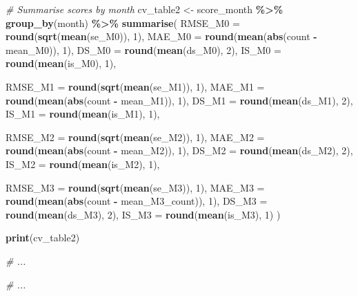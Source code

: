 \documentclass[
]{article}
\newenvironment{Shaded}{\begin{snugshade}}{\end{snugshade}}
\newcommand{\AttributeTok}[1]{\textcolor[rgb]{0.13,0.29,0.53}{#1}}
\newcommand{\CommentTok}[1]{\textcolor[rgb]{0.56,0.35,0.01}{\textit{#1}}}
\newcommand{\DecValTok}[1]{\textcolor[rgb]{0.00,0.00,0.81}{#1}}
\newcommand{\FunctionTok}[1]{\textcolor[rgb]{0.13,0.29,0.53}{\textbf{#1}}}
\newcommand{\NormalTok}[1]{#1}
\newcommand{\OtherTok}[1]{\textcolor[rgb]{0.56,0.35,0.01}{#1}}
\newcommand{\SpecialCharTok}[1]{\textcolor[rgb]{0.81,0.36,0.00}{\textbf{#1}}}
\begin{document}
\begin{Shaded}
\begin{Highlighting}[]
\CommentTok{\# Summarise scores by month}
\NormalTok{cv\_table2 }\OtherTok{\textless{}{-}}\NormalTok{ score\_month }\SpecialCharTok{\%\textgreater{}\%}
  \FunctionTok{group\_by}\NormalTok{(month) }\SpecialCharTok{\%\textgreater{}\%}
  \FunctionTok{summarise}\NormalTok{(}
    \AttributeTok{RMSE\_M0 =} \FunctionTok{round}\NormalTok{(}\FunctionTok{sqrt}\NormalTok{(}\FunctionTok{mean}\NormalTok{(se\_M0)), }\DecValTok{1}\NormalTok{),}
    \AttributeTok{MAE\_M0  =} \FunctionTok{round}\NormalTok{(}\FunctionTok{mean}\NormalTok{(}\FunctionTok{abs}\NormalTok{(count }\SpecialCharTok{{-}}\NormalTok{ mean\_M0)), }\DecValTok{1}\NormalTok{),}
    \AttributeTok{DS\_M0   =} \FunctionTok{round}\NormalTok{(}\FunctionTok{mean}\NormalTok{(ds\_M0), }\DecValTok{2}\NormalTok{),}
    \AttributeTok{IS\_M0   =} \FunctionTok{round}\NormalTok{(}\FunctionTok{mean}\NormalTok{(is\_M0), }\DecValTok{1}\NormalTok{),}
    
    \AttributeTok{RMSE\_M1 =} \FunctionTok{round}\NormalTok{(}\FunctionTok{sqrt}\NormalTok{(}\FunctionTok{mean}\NormalTok{(se\_M1)), }\DecValTok{1}\NormalTok{),}
    \AttributeTok{MAE\_M1  =} \FunctionTok{round}\NormalTok{(}\FunctionTok{mean}\NormalTok{(}\FunctionTok{abs}\NormalTok{(count }\SpecialCharTok{{-}}\NormalTok{ mean\_M1)), }\DecValTok{1}\NormalTok{),}
    \AttributeTok{DS\_M1   =} \FunctionTok{round}\NormalTok{(}\FunctionTok{mean}\NormalTok{(ds\_M1), }\DecValTok{2}\NormalTok{),}
    \AttributeTok{IS\_M1   =} \FunctionTok{round}\NormalTok{(}\FunctionTok{mean}\NormalTok{(is\_M1), }\DecValTok{1}\NormalTok{),}
    
    \AttributeTok{RMSE\_M2 =} \FunctionTok{round}\NormalTok{(}\FunctionTok{sqrt}\NormalTok{(}\FunctionTok{mean}\NormalTok{(se\_M2)), }\DecValTok{1}\NormalTok{),}
    \AttributeTok{MAE\_M2  =} \FunctionTok{round}\NormalTok{(}\FunctionTok{mean}\NormalTok{(}\FunctionTok{abs}\NormalTok{(count }\SpecialCharTok{{-}}\NormalTok{ mean\_M2)), }\DecValTok{1}\NormalTok{),}
    \AttributeTok{DS\_M2   =} \FunctionTok{round}\NormalTok{(}\FunctionTok{mean}\NormalTok{(ds\_M2), }\DecValTok{2}\NormalTok{),}
    \AttributeTok{IS\_M2   =} \FunctionTok{round}\NormalTok{(}\FunctionTok{mean}\NormalTok{(is\_M2), }\DecValTok{1}\NormalTok{),}
    
    \AttributeTok{RMSE\_M3 =} \FunctionTok{round}\NormalTok{(}\FunctionTok{sqrt}\NormalTok{(}\FunctionTok{mean}\NormalTok{(se\_M3)), }\DecValTok{1}\NormalTok{),}
    \AttributeTok{MAE\_M3  =} \FunctionTok{round}\NormalTok{(}\FunctionTok{mean}\NormalTok{(}\FunctionTok{abs}\NormalTok{(count }\SpecialCharTok{{-}}\NormalTok{ mean\_M3\_count)), }\DecValTok{1}\NormalTok{),}
    \AttributeTok{DS\_M3   =} \FunctionTok{round}\NormalTok{(}\FunctionTok{mean}\NormalTok{(ds\_M3), }\DecValTok{2}\NormalTok{),}
    \AttributeTok{IS\_M3   =} \FunctionTok{round}\NormalTok{(}\FunctionTok{mean}\NormalTok{(is\_M3), }\DecValTok{1}\NormalTok{)}
\NormalTok{  )}

\FunctionTok{print}\NormalTok{(cv\_table2)}

\CommentTok{\# ...}





\CommentTok{\# ...}
\end{Highlighting}
\end{Shaded}
\end{document}
